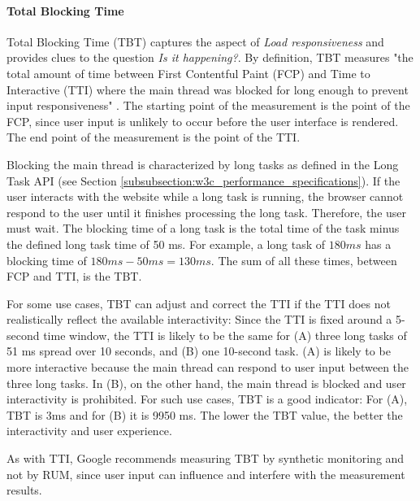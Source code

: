 \paragraph{Total Blocking Time} %


Total Blocking Time (TBT) captures the aspect of \textit{Load responsiveness} and provides clues to the question \textit{Is it happening?}.
By definition, TBT measures "the total amount of time between First Contentful Paint (FCP) and Time to Interactive (TTI) where the main thread was blocked for long enough to prevent input responsiveness" \cite{2020WaltonTBT}.
The starting point of the measurement is the point of the FCP, since user input is unlikely to occur before the user interface is rendered.
The end point of the measurement is the point of the TTI.

Blocking the main thread is characterized by long tasks as defined in the Long Task API (see Section \ref{subsubsection:w3c_performance_specifications}).
If the user interacts with the website while a long task is running, the browser cannot respond to the user until it finishes processing the long task.
Therefore, the user must wait.
The blocking time of a long task is the total time of the task minus the defined long task time of 50 ms.
For example, a long task of $180ms$ has a blocking time of $180ms - 50ms = 130ms$.
The sum of all these times, between FCP and TTI, is the TBT.


For some use cases, TBT can adjust and correct the TTI if the TTI does not realistically reflect the available interactivity:
Since the TTI is fixed around a 5-second time window, the TTI is likely to be the same for (A) three long tasks of 51 ms spread over 10 seconds, and (B) one 10-second task.
(A) is likely to be more interactive because the main thread can respond to user input between the three long tasks.
In (B), on the other hand, the main thread is blocked and user interactivity is prohibited.
For such use cases, TBT is a good indicator:
For (A), TBT is 3ms and for (B) it is 9950 ms.
The lower the TBT value, the better the interactivity and user experience.

As with TTI, Google recommends measuring TBT by synthetic monitoring and not by RUM, since user input can influence and interfere with the measurement results. \\


